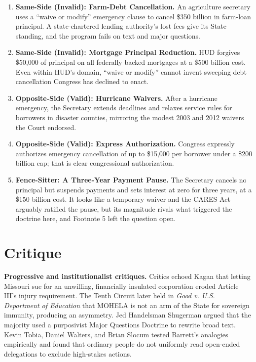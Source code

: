 \documentclass[12pt]{article}
\begin{document}
\begin{enumerate}
\item \textbf{Same-Side (Invalid): Farm-Debt Cancellation.} An agriculture secretary uses a ``waive or modify'' emergency clause to cancel \$350 billion in farm-loan principal. A state-chartered lending authority's lost fees give its State standing, and the program fails on text and major questions.
\item \textbf{Same-Side (Invalid): Mortgage Principal Reduction.} HUD forgives \$50,000 of principal on all federally backed mortgages at a \$500 billion cost. Even within HUD's domain, ``waive or modify'' cannot invent sweeping debt cancellation Congress has declined to enact.
\item \textbf{Opposite-Side (Valid): Hurricane Waivers.} After a hurricane emergency, the Secretary extends deadlines and relaxes service rules for borrowers in disaster counties, mirroring the modest 2003 and 2012 waivers the Court endorsed.
\item \textbf{Opposite-Side (Valid): Express Authorization.} Congress expressly authorizes emergency cancellation of up to \$15,000 per borrower under a \$200 billion cap; that is clear congressional authorization.
\item \textbf{Fence-Sitter: A Three-Year Payment Pause.} The Secretary cancels no principal but suspends payments and sets interest at zero for three years, at a \$150 billion cost. It looks like a temporary waiver and the CARES Act arguably ratified the pause, but its magnitude rivals what triggered the doctrine here, and Footnote 5 left the question open.
\end{enumerate}

\section{Critique}

\textbf{Progressive and institutionalist critiques.} Critics echoed Kagan that letting Missouri sue for an unwilling, financially insulated corporation eroded Article III's injury requirement. The Tenth Circuit later held in \textit{Good v. U.S. Department of Education} that MOHELA is not an arm of the State for sovereign immunity, producing an asymmetry. Jed Handelsman Shugerman argued that the majority used a purposivist Major Questions Doctrine to rewrite broad text. Kevin Tobia, Daniel Walters, and Brian Slocum tested Barrett's analogies empirically and found that ordinary people do not uniformly read open-ended delegations to exclude high-stakes actions.
\end{document}
